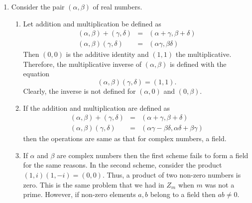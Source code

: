 \begin{enumerate}
\item Consider the pair $(\alpha, \beta)$ of real numbers.
\begin{enumerate}
\item Let addition and multiplication be defined as
\begin{eqnarray*}
(\alpha, \beta) + (\gamma, \delta) &=& (\alpha + \gamma, \beta + \delta) \\
(\alpha, \beta)(\gamma, \delta) &=& (\alpha\gamma, \beta\delta)
\end{eqnarray*}
Then $(0, 0)$ is the additive identity and $(1, 1)$ the multiplicative. 
Therefore, the multiplicative inverse of $(\alpha, \beta)$ is defined with the
equation
\[
(\alpha, \beta)(\gamma, \delta) = (1, 1).
\]
Clearly, the inverse is not defined for $(\alpha, 0)$ and $(0, \beta)$.

\item If the addition and multiplication are defined as
\begin{eqnarray*}
(\alpha, \beta) + (\gamma, \delta) &=& (\alpha + \gamma, \beta + \delta) \\
(\alpha, \beta)(\gamma, \delta) &=& (\alpha\gamma - \beta\delta,
                                     \alpha\delta + \beta\gamma)
\end{eqnarray*}
then the operations are same as that for complex numbers, a field.

\item If $\alpha$ and $\beta$ are complex numbers then the first scheme fails
to form a field for the same reasons. In the second scheme, consider the
product $(1, i)(1, -i) = (0, 0)$. Thus, a product of two non-zero numbers is
zero. This is the same problem that we had in $Z_m$ when $m$ was not a prime.
However, if non-zero elements $a, b$ belong to a field then $ab \ne 0$.
\end{enumerate}

\end{enumerate}

